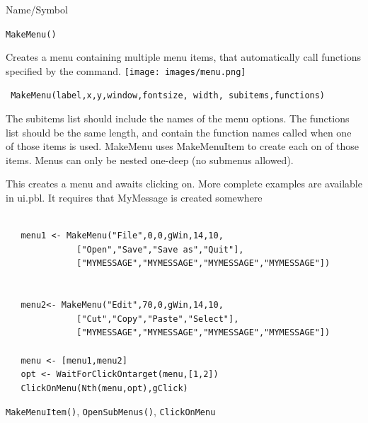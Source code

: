 \begin{desc}{Name/Symbol}
\item[Name/Symbol]  	\verb+MakeMenu()+

\item[Description]	
Creates a menu containing multiple menu items, that automatically call functions specified by the command.
 \texttt{[image: images/menu.png]}

\item[Usage]
\begin{verbatim}
 MakeMenu(label,x,y,window,fontsize, width, subitems,functions)
 \end{verbatim}

The subitems list should include the names of the menu options.  The functions list should be the same length, and contain the function names called when one of those items is used. MakeMenu uses MakeMenuItem to create each on of those items.  Menus can only be nested one-deep (no submenus allowed).

\item[Example]      	
This creates a menu and awaits clicking on.  More complete examples are available in ui.pbl.  It requires that MyMessage is created somewhere
\begin{verbatim}

   menu1 <- MakeMenu("File",0,0,gWin,14,10,
              ["Open","Save","Save as","Quit"],
              ["MYMESSAGE","MYMESSAGE","MYMESSAGE","MYMESSAGE"])


   menu2<- MakeMenu("Edit",70,0,gWin,14,10,    
              ["Cut","Copy","Paste","Select"],
              ["MYMESSAGE","MYMESSAGE","MYMESSAGE","MYMESSAGE"])

   menu <- [menu1,menu2]
   opt <- WaitForClickOntarget(menu,[1,2])
   ClickOnMenu(Nth(menu,opt),gClick)
\end{verbatim}

\item[See Also]	\verb+MakeMenuItem()+, \verb+OpenSubMenus()+, \verb+ClickOnMenu+
\end{desc}



